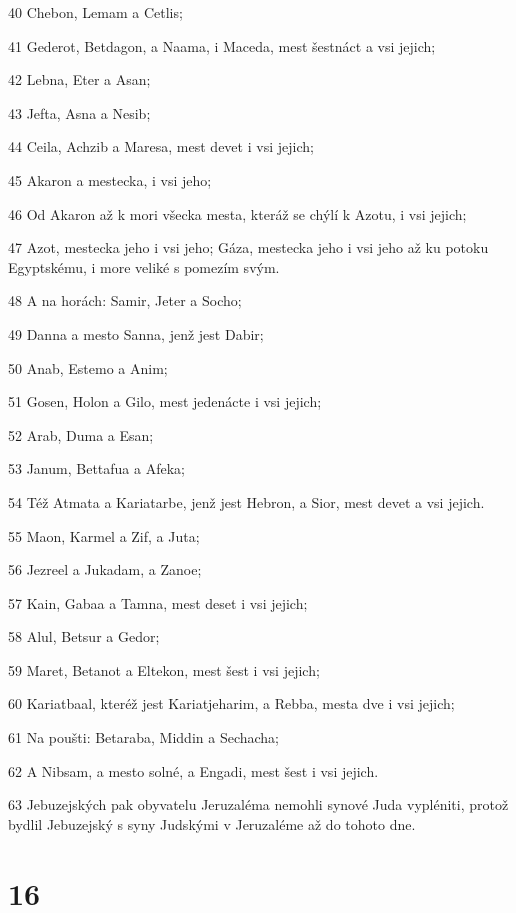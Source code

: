 \par 40 Chebon, Lemam a Cetlis;
\par 41 Gederot, Betdagon, a Naama, i Maceda, mest šestnáct a vsi jejich;
\par 42 Lebna, Eter a Asan;
\par 43 Jefta, Asna a Nesib;
\par 44 Ceila, Achzib a Maresa, mest devet i vsi jejich;
\par 45 Akaron a mestecka, i vsi jeho;
\par 46 Od Akaron až k mori všecka mesta, kteráž se chýlí k Azotu, i vsi jejich;
\par 47 Azot, mestecka jeho i vsi jeho; Gáza, mestecka jeho i vsi jeho až ku potoku Egyptskému, i more veliké s pomezím svým.
\par 48 A na horách: Samir, Jeter a Socho;
\par 49 Danna a mesto Sanna, jenž jest Dabir;
\par 50 Anab, Estemo a Anim;
\par 51 Gosen, Holon a Gilo, mest jedenácte i vsi jejich;
\par 52 Arab, Duma a Esan;
\par 53 Janum, Bettafua a Afeka;
\par 54 Též Atmata a Kariatarbe, jenž jest Hebron, a Sior, mest devet a vsi jejich.
\par 55 Maon, Karmel a Zif, a Juta;
\par 56 Jezreel a Jukadam, a Zanoe;
\par 57 Kain, Gabaa a Tamna, mest deset i vsi jejich;
\par 58 Alul, Betsur a Gedor;
\par 59 Maret, Betanot a Eltekon, mest šest i vsi jejich;
\par 60 Kariatbaal, kteréž jest Kariatjeharim, a Rebba, mesta dve i vsi jejich;
\par 61 Na poušti: Betaraba, Middin a Sechacha;
\par 62 A Nibsam, a mesto solné, a Engadi, mest šest i vsi jejich.
\par 63 Jebuzejských pak obyvatelu Jeruzaléma nemohli synové Juda vypléniti, protož bydlil Jebuzejský s syny Judskými v Jeruzaléme až do tohoto dne.

\chapter{16}

